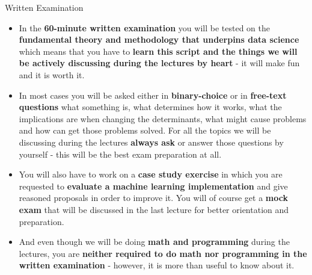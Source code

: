 \documentclass[document.tex]{subfiles}
\begin{document}
    \begin{frame}{Written Examination}
        \begin{itemize}
            \item In the \textbf{60-minute written examination} you will be tested on the \textbf{fundamental theory and methodology that underpins data science} which means that you have to \textbf{learn this script and the things we will be actively discussing during the lectures by heart} - it will make fun and it is worth it.
            \item In most cases you will be asked either in \textbf{binary-choice} or in \textbf{free-text questions} what something is, what determines how it works, what the implications are when changing the determinants, what might cause problems and how can get those problems solved. For all the topics we will be discussing during the lectures \textbf{always ask} or answer those questions by yourself - this will be the best exam preparation at all.
            \item You will also have to work on a \textbf{case study exercise} in which you are requested to \textbf{evaluate a machine learning implementation} and give reasoned proposals in order to improve it. You will of course get a \textbf{mock exam} that will be discussed in the last lecture for better orientation and preparation.
            \item And even though we will be doing \textbf{math and programming} during the lectures, you are \textbf{neither required to do math nor programming in the written examination} - however, it is more than useful to know about it.
        \end{itemize}
    \end{frame}
\end{document}
